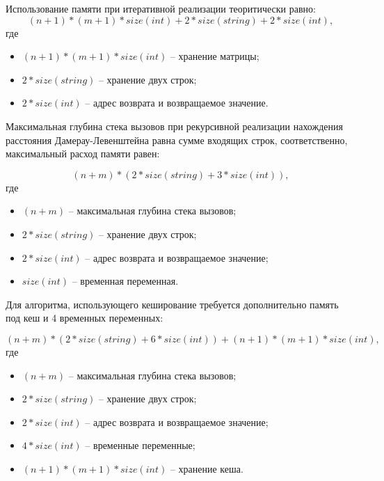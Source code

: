 Использование памяти при итеративной реализации теоритически равно:
\begin{equation}
	(n + 1) * (m + 1) * size(int) + 2 * size(string) + 2 * size(int),
\end{equation}
где 
\begin{itemize}
	\item $ (n + 1) * (m + 1) * size(int) $ -- хранение матрицы;
	\item $ 2 * size(string) $ -- хранение двух строк;
	\item $ 2 * size(int) $ -- адрес возврата и возвращаемое значение.
\end{itemize}


Максимальная глубина стека вызовов при рекурсивной реализации
нахождения расстояния Дамерау-Левенштейна равна сумме входящих строк,
соответственно, максимальный расход памяти равен:

\begin{equation}
	(n + m) * (2 * size(string) + 3 * size(int)),
\end{equation}
где 
\begin{itemize}
	\item $ (n + m) $ -- максимальная глубина стека вызовов;
	\item $ 2 * size(string) $ -- хранение двух строк;
	\item $ 2 * size(int) $ -- адрес возврата и возвращаемое значение;
	\item $ size(int) $ -- временная переменная.
\end{itemize}

Для алгоритма, использующего кеширование требуется дополнительно память под кеш и 4 временных переменных:

\begin{equation}
	(n + m) * (2 * size(string) + 6 * size(int)) + (n + 1) * (m + 1) * size(int),
\end{equation}
где 
\begin{itemize}
	\item $ (n + m) $ -- максимальная глубина стека вызовов;
	\item $ 2 * size(string) $ -- хранение двух строк;
	\item $ 2 * size(int) $ -- адрес возврата и возвращаемое значение;
	\item $ 4 * size(int) $ -- временные переменные;
	\item $ (n + 1) * (m + 1) * size(int) $ -- хранение кеша.
\end{itemize}

